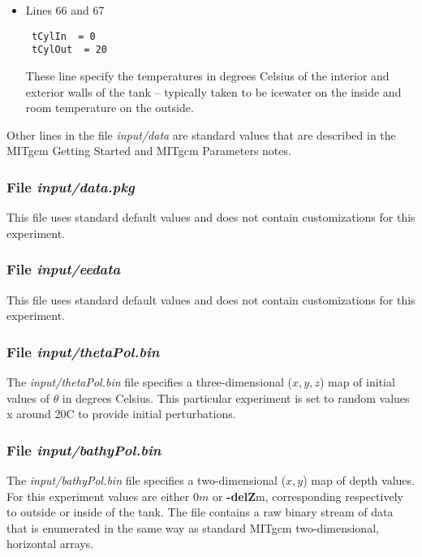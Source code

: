 \begin{itemize}
\item Lines 66 and 67
\begin{verbatim}
 tCylIn  = 0
 tCylOut  = 20
\end{verbatim}
These line specify the temperatures in degrees Celsius of the interior
and exterior walls of the tank -- typically taken to be icewater on
the inside and room temperature on the outside.


\end{itemize}

\noindent Other lines in the file {\it input/data} are standard values
that are described in the MITgcm Getting Started and MITgcm Parameters
notes.

\begin{small}

\end{small}

\subsubsection{File {\it input/data.pkg}}

This file uses standard default values and does not contain
customizations for this experiment.

\subsubsection{File {\it input/eedata}}

This file uses standard default values and does not contain
customizations for this experiment.

\subsubsection{File {\it input/thetaPol.bin}}

The {\it input/thetaPol.bin} file specifies a three-dimensional ($x,y,z$) 
map of initial values of $\theta$ in degrees Celsius.  This particular 
experiment is set to random values x around 20C to provide initial 
perturbations.

\subsubsection{File {\it input/bathyPol.bin}}


The {\it input/bathyPol.bin} file specifies a two-dimensional ($x,y$) 
map of depth values. For this experiment values are either
$0m$ or {\bf -delZ}m, corresponding respectively to outside or inside of
the tank. The file contains a raw binary stream of data that is enumerated
in the same way as standard MITgcm two-dimensional, horizontal arrays.

